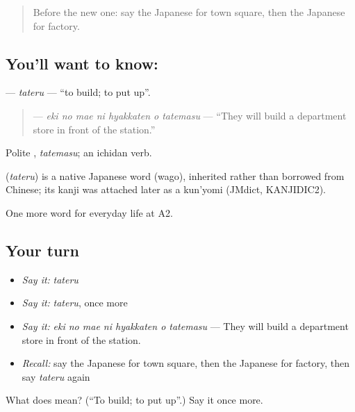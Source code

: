 \begin{quote}
Before the new one: say the Japanese for town square, then the Japanese for factory.
\end{quote}

\subsection*{You'll want to know: }
\textbf{} — \emph{tateru} — \textquotedblleft{}to build; to put up\textquotedblright{}.

\begin{quote}
\textbf{   } — \emph{eki no mae ni hyakkaten o tatemasu} — \textquotedblleft{}They will build a department store in front of the station.\textquotedblright{}
\end{quote}

Polite \textbf{}, \emph{tatemasu}; an ichidan verb.

\begin{cousinweb}
\textbf{} (\emph{tateru}) is a native Japanese word (wago), inherited rather than borrowed from Chinese; its kanji was attached later as a kun'yomi (JMdict, KANJIDIC2).
\end{cousinweb}

\begin{grammarlens}[title={What you've built}]
One more word for everyday life at A2.
\end{grammarlens}

\subsection*{Your turn}
\begin{itemize}
\raggedright
  \item \emph{Say it:} \emph{tateru}
  \item \emph{Say it:} \emph{tateru}, once more
  \item \emph{Say it:} \emph{eki no mae ni hyakkaten o tatemasu} — They will build a department store in front of the station.
  \item \emph{Recall:} say the Japanese for town square, then the Japanese for factory, then say \emph{tateru} again
\end{itemize}

\begin{tcolorbox}[breakable,colback=teal!4,colframe=teal!35!black,title={Before you move on}]
What does  mean? (\textquotedblleft{}To build; to put up\textquotedblright{}.) Say it once more.
\end{tcolorbox}
